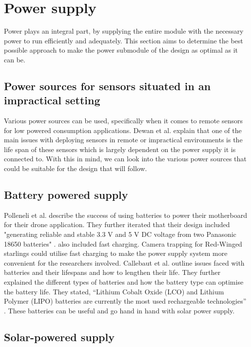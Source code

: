 \documentclass[class=report,11pt,crop=false]{standalone}
\begin{document}
\section{Power supply}

Power plays an integral part, by supplying the entire module with the necessary power to run efficiently and adequately. This section aims to determine the best possible approach to make the power submodule of the design as optimal as it can be.

\subsection{Power sources for sensors situated in an impractical setting}

Various power sources can be used, specifically when it comes to remote sensors for low powered consumption applications. Dewan et al. \cite{dewan2014alternative} explain that one of the main issues with deploying sensors in remote or impractical environments is the life span of these sensors which is largely dependent on the power supply it is connected to. With this in mind, we can look into the various power sources that could be suitable for the design that will follow.

\subsection{Battery powered supply}

Polleneli et al. \cite{polonelli2020flexible} describe the success of using batteries to power their motherboard for their drone application. They further iterated that their design included "generating reliable and stable 3.3 V and 5 V DC voltage from two Panasonic 18650 batteries" \cite{polonelli2020flexible}. \cite{polonelli2020flexible} also included fast charging. Camera trapping for Red-Winged starlings could utilise fast charging to make the power supply system more convenient for the researchers involved. Callebaut et al. \cite{callebaut2021art} outline issues faced with batteries and their lifespans and how to lengthen their life. They further explained the different types of batteries and how the battery type can optimise the battery life. They stated, “Lithium Cobalt Oxide (LCO) and Lithium Polymer (LIPO) batteries are currently the most used rechargeable technologies” \cite{callebaut2021art}. These batteries can be useful and go hand in hand with solar power supply.

\subsection{Solar-powered supply}
\end{document}
